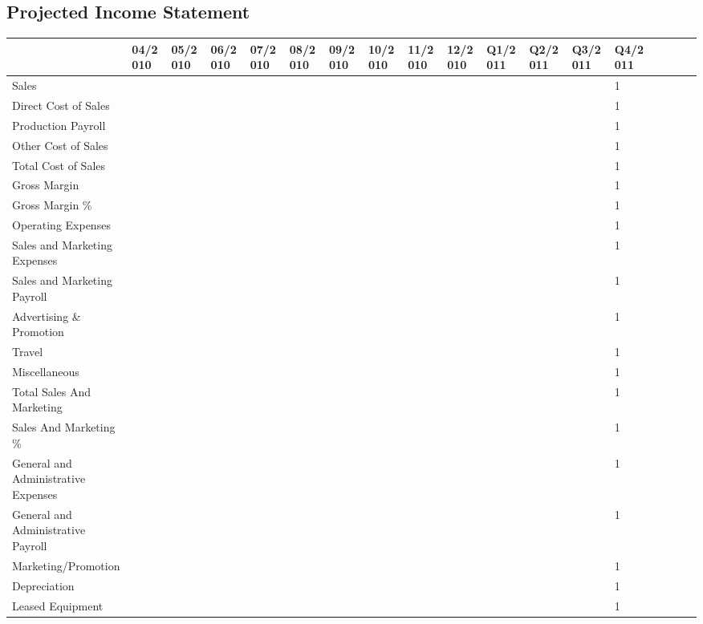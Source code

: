 \documentclass[11pt,titlepage]{article}
\begin{document}
\begin{landscape}
\subsection{Projected Income Statement}
\begin{scriptsize}
\begin{tabular}{ | l | l | l | l | l | l | l | l | l | l | l | l | l | l | l | l | l | l |}\hline
  & 04/2010 & 05/2010 & 06/2010 & 07/2010 & 08/2010 & 09/2010 & 10/2010 & 11/2010 & 12/2010 & Q1/2011 & Q2/2011 & Q3/2011 & Q4/2011 \\ \hline
  Sales & & & & & & & & & & & & & 1\\ \hline
  Direct Cost of Sales & & & & & & & & & & & & & 1 \\ \hline
  Production Payroll & & & & & & & & & & & & & 1 \\ \hline
  Other Cost of Sales & & & & & & & & & & & & & 1 \\ \hline
  Total Cost of Sales & & & & & & & & & & & & & 1 \\ \hline
  Gross Margin & & & & & & & & & & & & & 1 \\ \hline
  Gross Margin \% & & & & & & & & & & & & & 1 \\ \hline
  Operating Expenses & & & & & & & & & & & & & 1 \\ \hline
  Sales and Marketing Expenses & & & & & & & & & & & & & 1 \\ \hline
  Sales and Marketing Payroll & & & & & & & & & & & & & 1 \\ \hline
  Advertising \& Promotion & & & & & & & & & & & & & 1 \\ \hline
  Travel & & & & & & & & & & & & & 1 \\ \hline
  Miscellaneous & & & & & & & & & & & & & 1 \\ \hline
  Total Sales And Marketing & & & & & & & & & & & & & 1 \\ \hline
  Sales And Marketing \% & & & & & & & & & & & & & 1 \\ \hline
  General and Administrative Expenses & & & & & & & & & & & & & 1 \\ \hline
  General and Administrative Payroll & & & & & & & & & & & & & 1 \\ \hline
  Marketing/Promotion & & & & & & & & & & & & & 1 \\ \hline
  Depreciation & & & & & & & & & & & & & 1 \\ \hline
  Leased Equipment & & & & & & & & & & & & & 1 \\ \hline

\end{tabular}
\end{scriptsize}
\end{landscape}
\end{document}
